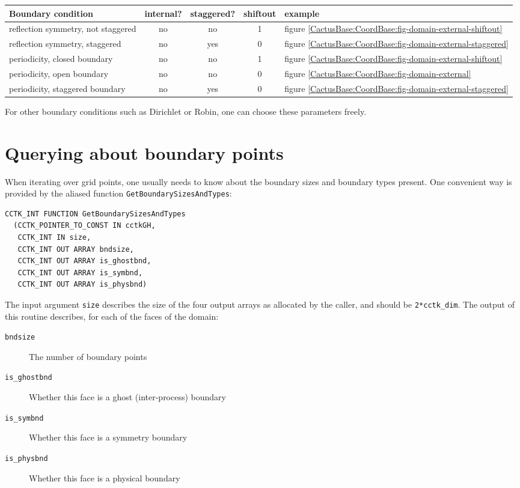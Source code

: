 \begin{tabular}{l|ccc|l}
Boundary condition & internal? & staggered? & shiftout & example \\\hline
reflection symmetry, not staggered & no & no & 1
   & figure {\ref{CactusBase:CoordBase:fig-domain-external-shiftout}} \\
reflection symmetry, staggered & no & yes & 0
   & figure {\ref{CactusBase:CoordBase:fig-domain-external-staggered}} \\
periodicity, closed boundary & no & no & 1
   & figure {\ref{CactusBase:CoordBase:fig-domain-external-shiftout}} \\
periodicity, open boundary & no & no & 0
   & figure {\ref{CactusBase:CoordBase:fig-domain-external}} \\
periodicity, staggered boundary & no & yes & 0
   & figure {\ref{CactusBase:CoordBase:fig-domain-external-staggered}}
\end{tabular}

For other boundary conditions such as Dirichlet or Robin, one can
choose these parameters freely.

\section{Querying about boundary points}
\label{CactusBase:CoordBase:boundary-query}

When iterating over grid points, one usually needs to know about the
boundary sizes and boundary types present. One convenient way is
provided by the aliased function \texttt{GetBoundarySizesAndTypes}:
\begin{verbatim}
CCTK_INT FUNCTION GetBoundarySizesAndTypes
  (CCTK_POINTER_TO_CONST IN cctkGH,
   CCTK_INT IN size,
   CCTK_INT OUT ARRAY bndsize,
   CCTK_INT OUT ARRAY is_ghostbnd,
   CCTK_INT OUT ARRAY is_symbnd,
   CCTK_INT OUT ARRAY is_physbnd)
\end{verbatim}
The input argument \texttt{size} describes the size of the four output
arrays as allocated by the caller, and should be \texttt{2*cctk\_dim}.
The output of this routine describes, for each of the faces of the
domain:
\begin{description}
\item[\texttt{bndsize}] The number of boundary points
\item[\texttt{is\_ghostbnd}] Whether this face is a ghost
  (inter-process) boundary
\item[\texttt{is\_symbnd}] Whether this face is a symmetry boundary
\item[\texttt{is\_physbnd}] Whether this face is a physical boundary
\end{description}

